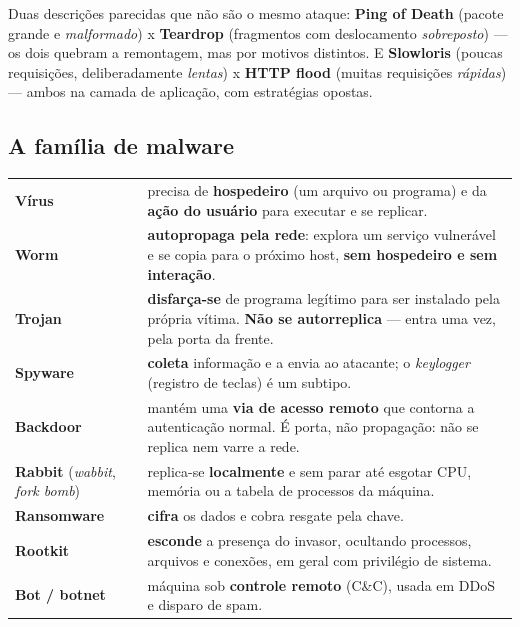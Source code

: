 \begin{cuidado}
Duas descrições parecidas que não são o mesmo ataque:
\textbf{Ping of Death} (pacote grande e \emph{malformado}) x
\textbf{Teardrop} (fragmentos com deslocamento \emph{sobreposto}) --- os
dois quebram a remontagem, mas por motivos distintos.
E \textbf{Slowloris} (poucas requisições, deliberadamente \emph{lentas}) x
\textbf{HTTP flood} (muitas requisições \emph{rápidas}) --- ambos na camada
de aplicação, com estratégias opostas.
\end{cuidado}

\subsection{A família de malware}

\begin{conceito}
\begin{center}
\begin{tabular}{@{}p{2.4cm}p{9.4cm}@{}}
\toprule
\textbf{Vírus} & precisa de \textbf{hospedeiro} (um arquivo ou programa) e
da \textbf{ação do usuário} para executar e se replicar. \\
\textbf{Worm} & \textbf{autopropaga pela rede}: explora um serviço
vulnerável e se copia para o próximo host, \textbf{sem hospedeiro e sem
interação}. \\
\textbf{Trojan} & \textbf{disfarça-se} de programa legítimo para ser
instalado pela própria vítima. \textbf{Não se autorreplica} --- entra uma
vez, pela porta da frente. \\
\textbf{Spyware} & \textbf{coleta} informação e a envia ao atacante; o
\textit{keylogger} (registro de teclas) é um subtipo. \\
\textbf{Backdoor} & mantém uma \textbf{via de acesso remoto} que contorna
a autenticação normal. É porta, não propagação: não se replica nem varre a
rede. \\
\textbf{Rabbit} \newline (\textit{wabbit}, \textit{fork bomb}) &
replica-se \textbf{localmente} e sem parar até esgotar CPU, memória ou a
tabela de processos da máquina. \\
\textbf{Ransomware} & \textbf{cifra} os dados e cobra resgate pela chave. \\
\textbf{Rootkit} & \textbf{esconde} a presença do invasor, ocultando
processos, arquivos e conexões, em geral com privilégio de sistema. \\
\textbf{Bot / botnet} & máquina sob \textbf{controle remoto} (C\&C),
usada em DDoS e disparo de spam. \\
\bottomrule
\end{tabular}
\end{center}
\end{conceito}

